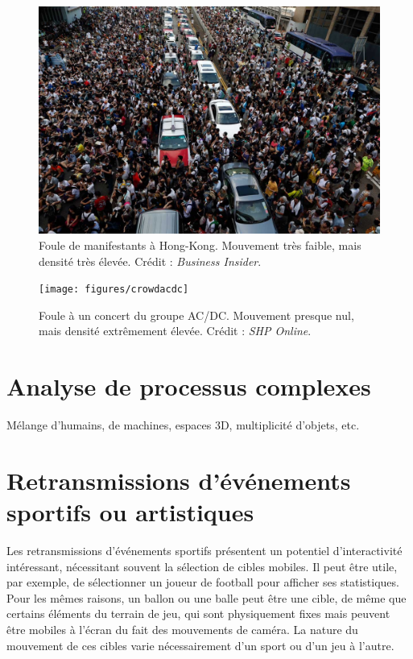 	\begin{figure}[H]
		\centering
		\includegraphics[width=\textwidth]{figures/crowdhk}
		\caption{Foule de manifestants à Hong-Kong. Mouvement très faible, mais densité très élevée. Crédit : \emph{Business Insider}.}
		\label{fig:crowdhk}
	\end{figure}
	
	\begin{figure}[htb]
		\centering
		\texttt{[image: figures/crowdacdc]}
		\caption{Foule à un concert du groupe AC/DC. Mouvement presque nul, mais densité extrêmement élevée. Crédit : \emph{SHP Online}.}
		\label{fig:crowdacdc}
	\end{figure}
	
	
	
	\section{Analyse de processus complexes}
	Mélange d'humains, de machines, espaces 3D, multiplicité d'objets, etc.
	
	\section{Retransmissions d'événements sportifs ou artistiques}
	Les retransmissions d'événements sportifs présentent un potentiel d'interactivité intéressant, nécessitant souvent la sélection de cibles mobiles. Il peut être utile, par exemple, de sélectionner un joueur de football pour afficher ses statistiques. Pour les mêmes raisons, un ballon ou une balle peut être une cible, de même que certains éléments du terrain de jeu, qui sont physiquement fixes mais peuvent être mobiles à l'écran du fait des mouvements de caméra. La nature du mouvement de ces cibles varie nécessairement d'un sport ou d'un jeu à l'autre.
	
